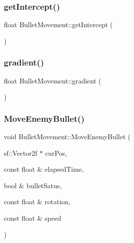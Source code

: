 \mbox{\label{class_bullet_movement_ab9716be6fffd1b7f58e5b3be24062e5b}} 
\subsubsection{\texorpdfstring{get\+Intercept()}{getIntercept()}}
{\footnotesize\ttfamily float Bullet\+Movement\+::get\+Intercept (\begin{DoxyParamCaption}{ }\end{DoxyParamCaption})\hspace{0.3cm}{\ttfamily [inline]}}

\mbox{\label{class_bullet_movement_a84efe87d137c1d0b9e14de5a5c9c7938}} 
\subsubsection{\texorpdfstring{gradient()}{gradient()}}
{\footnotesize\ttfamily float Bullet\+Movement\+::gradient (\begin{DoxyParamCaption}{ }\end{DoxyParamCaption})\hspace{0.3cm}{\ttfamily [private]}}

\mbox{\label{class_bullet_movement_ae7109a6098374d23e8dc2360d6546b7c}} 
\subsubsection{\texorpdfstring{Move\+Enemy\+Bullet()}{MoveEnemyBullet()}}
{\footnotesize\ttfamily void Bullet\+Movement\+::\+Move\+Enemy\+Bullet (\begin{DoxyParamCaption}\item[{sf\+::\+Vector2f $\ast$}]{cur\+Pos,  }\item[{const float \&}]{elapsed\+Time,  }\item[{bool \&}]{bullet\+Satus,  }\item[{const float \&}]{rotation,  }\item[{const float \&}]{speed }\end{DoxyParamCaption})}

